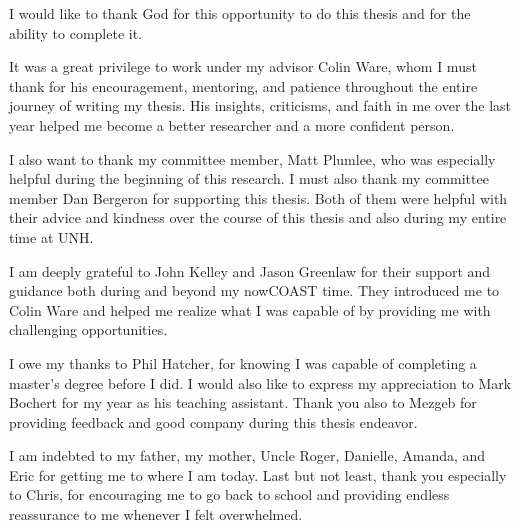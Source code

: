 \documentclass[11pt]{report}
\begin{document}
\begin{acknowledgments}
I would like to thank God for this opportunity to do this thesis and for the ability to complete it.

It was a great privilege to work under my advisor Colin Ware, whom I must thank for his encouragement, mentoring, and patience throughout the entire journey of writing my thesis.  His insights, criticisms, and faith in me over the last year helped me become a better researcher and a more confident person.

I also want to thank my committee member, Matt Plumlee, who was especially helpful during the beginning of this research.  I must also thank my committee member Dan Bergeron for supporting this thesis.  Both of them were helpful with their advice and kindness over the course of this thesis and also during my entire time at UNH.

I am deeply grateful to John Kelley and Jason Greenlaw for their support and guidance both during and beyond my nowCOAST time.  They introduced me to Colin Ware and helped me realize what I was capable of by providing me with challenging opportunities.

I owe my thanks to Phil Hatcher, for knowing I was capable of completing a master's degree before I did.  I would also like to express my appreciation to Mark Bochert for my year as his teaching assistant.  Thank you also to Mezgeb for providing feedback and good company during this thesis endeavor.

I am indebted to my father, my mother, Uncle Roger, Danielle, Amanda, and Eric for getting me to where I am today.  Last but not least, thank you especially to Chris, for encouraging me to go back to school and providing endless reassurance to me whenever I felt overwhelmed.  

\end{acknowledgments}                                   %


\tableofcontents					%
\listoffigures						%













\begin{appendices}







\end{appendices}
\end{document}
